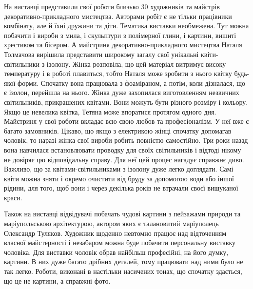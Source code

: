 На виставці представили свої роботи близько 30 художників та майстрів
декоративно-прикладного мистецтва. Авторами робіт є не тільки працівники
комбінату, але й їхні дружини та діти. Тематика виставки необмежена. Тут можна
побачити і вироби з мила, і скульптури з полімерної глини, і картини, вишиті
хрестиком та бісером. А майстриня декоративно-прикладного мистецтва Наталя
Толмачова вирішила представити широкому загалу свої унікальні квіти-світильники
з ізолону. Жінка розповіла, що цей матеріал витримує високу температуру і в
роботі плавиться, тобто Наталя може зробити з нього квітку будь-якої форми.
Спочатку вона працювала з фоаміраном, а потім, коли дізналася, що є ізолон,
перейшла на нього. Жінка дуже захопилася  виготовленням незвичних світильників,
прикрашених квітами. Вони можуть бути різного розміру і кольору. Якщо це
невелика квітка, Тетяна може впоратися протягом одного дня. Майстриня у свої
роботи вкладає всю свою любов та професіоналізм. У неї вже є багато замовників.
Цікаво, що якщо з електрикою жінці спочатку допомагав чоловік, то наразі жінка
свої вироби робить повністю самостійно. Три роки назад вона навчилася
встановлювати проводку для своїх світильників і відтоді нікому не довіряє цю
відповідальну справу. Для неї цей процес нагадує справжнє диво. Важливо, що за
квітами-світильниками з ізолону дуже легко доглядати. Самі квіти можна зняти і
окремо очистити від бруду за допомогою води або іншої рідини, для того, щоб
вони і через декілька років не втрачали своєї вишуканої краси.


Також на виставці відвідувачі побачать чудові картини з пейзажами  природи та
маріупольською архітектурою, автором яких є талановитий маріуполець Олександр
Туляков. Художник щоденно невтомно працює над відточенням власної майстерності
і незабаром можна  буде побачити персональну виставку чоловіка. Для виставки
чоловік обрав найбільш професійні, на його думку, картини. В них дуже  багато
дрібних деталей, тому працювати над ними було не так легко. Роботи, виконані в
настільки насичених тонах, що спочатку здається, що це не картини, а справжні
фото.


